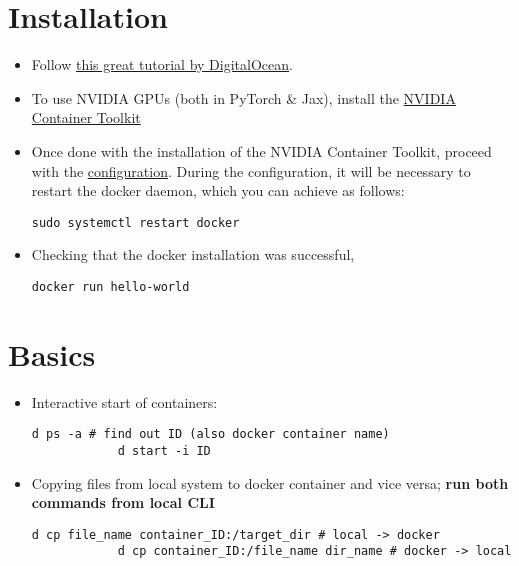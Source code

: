 \documentclass[12pt, a4paper]{scrbook}
\numberwithin{equation}{section}
\theoremstyle{definition}
\theoremstyle{definition}
\begin{document}
	\section{Installation}
	
	\begin{itemize}
		\item Follow  \href{https://www.digitalocean.com/community/tutorials/how-to-install-and-use-docker-on-ubuntu-20-04}{this great tutorial by DigitalOcean}.
		
		\item To use NVIDIA GPUs (both in PyTorch \& Jax), install the \href{https://docs.nvidia.com/datacenter/cloud-native/container-toolkit/latest/install-guide.html#installing-with-apt}{NVIDIA Container Toolkit}
		
		\item Once done with the installation of the NVIDIA Container Toolkit, proceed with the \href{https://docs.nvidia.com/datacenter/cloud-native/container-toolkit/latest/install-guide.html#configuring-docker}{configuration}. During the configuration, it will be necessary to restart the docker daemon, which you can achieve as follows: 
		
		\begin{lstlisting}[style=mystylebash, xleftmargin=\parindent]
			sudo systemctl restart docker
		\end{lstlisting}
	
		\item Checking that the docker installation was successful, 
		
		\begin{lstlisting}[style=mystylebash, xleftmargin=\parindent]
			docker run hello-world
		\end{lstlisting}
		
	\end{itemize}
	
	\section{Basics}
	
	\begin{itemize} 
		\item Interactive start of containers: 
		
		\begin{lstlisting}[style=mystylebash, label=alg:docker_id, xleftmargin=\parindent]
			d ps -a # find out ID (also docker container name)
			d start -i ID
		\end{lstlisting}
		
		\item Copying files from local system to docker container and vice versa; \textbf{run both commands from local CLI}
		
		\begin{lstlisting}[style=mystylebash, label=alg:docker_cp, xleftmargin=\parindent]
			d cp file_name container_ID:/target_dir # local -> docker
			d cp container_ID:/file_name dir_name # docker -> local
		\end{lstlisting}
		
	\end{itemize}
	
\end{document}
